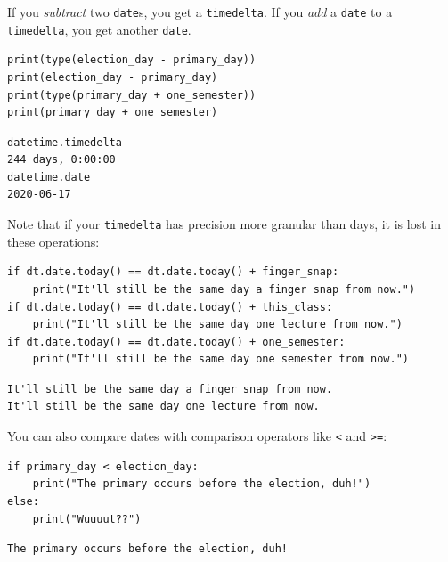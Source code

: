 \begin{itemize}
If you \textit{subtract} two \texttt{date}s, you get a \texttt{timedelta}. If
you \textit{add} a \texttt{date} to a \texttt{timedelta}, you get another
\texttt{date}.

\begin{Verbatim}[fontsize=\small,samepage=true,frame=single,framesep=3mm]
print(type(election_day - primary_day))
print(election_day - primary_day)
print(type(primary_day + one_semester))
print(primary_day + one_semester)
\end{Verbatim}

\begin{Verbatim}[fontsize=\small,samepage=true,frame=leftline,framesep=5mm,framerule=1mm]
datetime.timedelta
244 days, 0:00:00
datetime.date
2020-06-17
\end{Verbatim}

Note that if your \texttt{timedelta} has precision more granular than days, it
is lost in these operations:

\begin{Verbatim}[fontsize=\scriptsize,samepage=true,frame=single,framesep=3mm]
if dt.date.today() == dt.date.today() + finger_snap:
    print("It'll still be the same day a finger snap from now.")
if dt.date.today() == dt.date.today() + this_class:
    print("It'll still be the same day one lecture from now.")
if dt.date.today() == dt.date.today() + one_semester:
    print("It'll still be the same day one semester from now.")
\end{Verbatim}
\vspace{-.2in}

\begin{Verbatim}[fontsize=\footnotesize,samepage=true,frame=leftline,framesep=5mm,framerule=1mm]
It'll still be the same day a finger snap from now.
It'll still be the same day one lecture from now.
\end{Verbatim}
\normalsize

You can also compare dates with comparison operators like \texttt{<} and
\texttt{>=}:

\begin{Verbatim}[fontsize=\footnotesize,samepage=true,frame=single,framesep=3mm]
if primary_day < election_day:
    print("The primary occurs before the election, duh!")
else:
    print("Wuuuut??")
\end{Verbatim}
\vspace{-.2in}

\begin{Verbatim}[fontsize=\small,samepage=true,frame=leftline,framesep=5mm,framerule=1mm]
The primary occurs before the election, duh!
\end{Verbatim}


\end{itemize}
